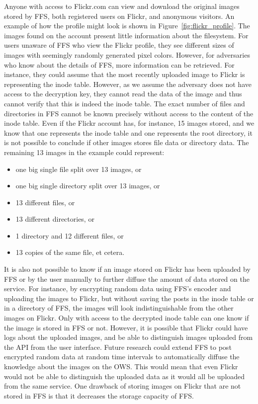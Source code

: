 Anyone with access to Flickr.com can view and download the original images stored by \gls{FFS}, both registered users on Flickr, and anonymous visitors. An example of how the profile might look is shown in Figure~\ref{fig:flickr_profile}. The images found on the account present little information about the filesystem. For users unaware of \gls{FFS} who view the Flickr profile, they see different sizes of images with seemingly randomly generated pixel colors. However, for adversaries who know about the details of \gls{FFS}, more information can be retrieved. For instance, they could assume that the most recently uploaded image to Flickr is representing the inode table. However, as we assume the adversary does not have access to the decryption key, they cannot read the data of the image and thus cannot verify that this is indeed the inode table. The exact number of files and directories in \gls{FFS} cannot be known precisely without access to the content of the inode table. Even if the Flickr account has, for instance, 15 images stored, and we know that one represents the inode table and one represents the root directory, it is not possible to conclude if other images stores file data or directory data. The remaining 13 images in the example could represent:
\begin{itemize}
	\item one big single file split over 13 images, or
	\item one big single directory split over 13 images, or
	\item 13 different files, or
	\item 13 different directories, or
	\item 1 directory and 12 different files, or
	\item 13 copies of the same file, et cetera.
\end{itemize}
It is also not possible to know if an image stored on Flickr has been uploaded by \gls{FFS} or by the user manually to further diffuse the amount of data stored on the service. For instance, by encrypting random data using \gls{FFS}'s encoder and uploading the images to Flickr, but without saving the posts in the inode table or in a directory of \gls{FFS}, the images will look indistinguishable from the other images on Flickr. Only with access to the decrypted inode table can one know if the image is stored in \gls{FFS} or not. However, it is possible that Flickr could have logs about the uploaded images, and be able to distinguish images uploaded from the \gls{API} from the user interface. Future research could extend \gls{FFS} to post encrypted random data at random time intervals to automatically diffuse the knowledge about the images on the \gls{OWS}. This would mean that even Flickr would not be able to distinguish the uploaded data as it would all be uploaded from the same service. One drawback of storing images on Flickr that are not stored in \gls{FFS} is that it decreases the storage capacity of \gls{FFS}.


